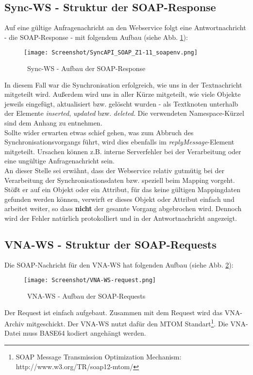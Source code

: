\documentclass[a4paper,10pt]{book}
\begin{document}
\subsection{Sync-WS - Struktur der SOAP-Response}
Auf eine gültige Anfragenachricht an den Webservice folgt eine Antwortnachricht - die SOAP-Response - mit
folgendem Aufbau (siehe Abb. \ref{Sync-WS - Aufbau der SOAP-Response}):
\newline
\begin{figure}[htb!]
  \centering
  \texttt{[image: Screenshot/SyncAPI\_SOAP\_Z1-11\_soapenv.png]}
  \caption{\label{Sync-WS - Aufbau der SOAP-Response} \ Sync-WS - Aufbau der SOAP-Response}
\end{figure}
\newline
In diesem Fall war die Synchronisation erfolgreich, wie uns in der Textnachricht mitgeteilt wird. Außerdem wird
uns in aller Kürze mitgeteilt, wie viele Objekte jeweils eingefügt, aktualisiert bzw. gelöscht wurden - als Textknoten
unterhalb der Elemente \textit{inserted}, \textit{updated} bzw. \textit{deleted}. Die verwendeten
Namespace-Kürzel sind dem Anhang zu entnehmen.
\newline\\
Sollte wider erwarten etwas schief gehen, was zum Abbruch des Synchronisationsvorgangs führt, wird dies ebenfalls
im \textit{replyMessage}-Element mitgeteilt. Ursachen können z.B. interne Serverfehler bei der Verarbeitung oder
eine ungültige Anfragenachricht sein.
\newline\\
An dieser Stelle sei erwähnt, dass der Webservice relativ gutmütig bei der Verarbeitung der Synchronisationsdaten bzw.
speziell beim Mapping vorgeht. Stößt er auf ein Objekt oder ein Attribut, für das keine gültigen Mappingdaten gefunden
werden können, verwirft er dieses Objekt oder Attribut einfach und arbeitet weiter, so dass \textbf{nicht} der gesamte
Vorgang abgebrochen wird. Dennoch wird der Fehler natürlich protokolliert und in der Antwortnachricht angezeigt.

\subsection{VNA-WS - Struktur der SOAP-Requests}

Die SOAP-Nachricht für den VNA-WS hat folgenden Aufbau (siehe
Abb.
\ref{fig:vna-ws-aufbau-der-soap-requests}):
\begin{figure}[htb!]
  \centering
  \texttt{[image: Screenshot/VNA-WS-request.png]}
  \caption{\label{fig:vna-ws-aufbau-der-soap-requests} \ VNA-WS -
    Aufbau der SOAP-Requests}
\end{figure}
Der Request ist einfach aufgebaut. Zusammen mit dem Request wird das
VNA-Archiv mitgeschickt. Der VNA-WS nutzt dafür den MTOM
Standart\footnote{SOAP Message Transmission Optimization Mechanism:
  http://www.w3.org/TR/soap12-mtom/}. Die VNA-Datei muss BASE64
kodiert angehängt werden.
\end{document}
